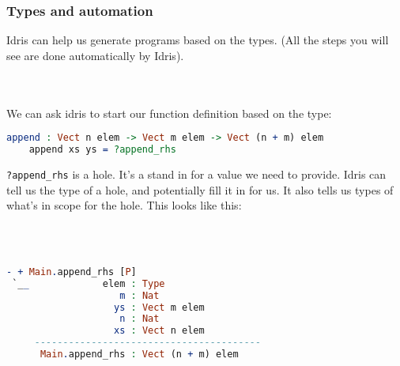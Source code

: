 \documentclass{beamer}
\begin{document}
\begin{frame}[fragile]
  \frametitle{Types and automation}

  Idris can help us generate programs based on the types. (All the steps you will see are done automatically by Idris).

  \pause \\~\\

  We can ask idris to start our function definition based on the type:

  \begin{lstlisting}[language=Idris]
    append : Vect n elem -> Vect m elem -> Vect (n + m) elem
    append xs ys = ?append_rhs
  \end{lstlisting}

  \pause
  \texttt{?append\_rhs} is a hole. It's a stand in for a value we need
  to provide. Idris can tell us the type of a hole, and potentially fill
  it in for us. It also tells us types of what's in scope for the hole. This looks like this:

  \pause \\~\\

  \begin{lstlisting}[language=Idris]
- + Main.append_rhs [P]
 `__             elem : Type
                    m : Nat
                   ys : Vect m elem
                    n : Nat
                   xs : Vect n elem
     ----------------------------------------
      Main.append_rhs : Vect (n + m) elem
  \end{lstlisting}

  
\end{frame}
\end{document}
